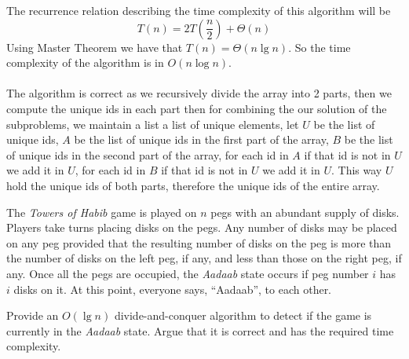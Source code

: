 \documentclass[addpoints]{exam}
\begin{document}
\begin{questions}
\begin{solution}
\begin{parts}
			

			The recurrence relation describing the time complexity of this algorithm will be
			$$T(n) = 2T\left(\frac{n}{2}\right) + \Theta(n)$$
			Using Master Theorem we have that $T(n) = \Theta(n\lg{n})$. So the time complexity of the algorithm is in $O(n\log{n})$.
			\\\\The algorithm is correct as we recursively divide the array into 2 parts, then we compute the unique ids in each part then for combining the our solution of the subproblems,
			we maintain a list a list of unique elements, let $U$ be the list of unique ids, $A$ be the list of unique ids in the first part of the array, $B$ be the list of unique ids in the second part of the array,
			for each id in $A$ if that id is not in $U$ we add it in $U$, for each id in $B$ if that id is not in $U$ we add it in $U$.
			This way $U$ hold the unique ids of both parts, therefore the unique ids of the entire array.
		\end{parts}
	\end{solution}

	\newpage

	\question[5] The \textit{Towers of Habib} game is played on $n$ pegs with an abundant supply of disks. Players take turns placing disks on the pegs. Any number of disks may be placed on any peg provided that the resulting number of disks on the peg is more than the number of disks on the left peg, if any, and less than those on the right peg, if any. Once all the pegs are occupied, the \textit{Aadaab} state occurs if peg number $i$ has $i$ disks on it. At this point, everyone says, ``Aadaab'', to each other.

	Provide an $O(\lg n)$ divide-and-conquer algorithm to detect if the game is currently in the \textit{Aadaab} state. Argue that it is correct and has the required time complexity.


\end{questions}
\end{document}

